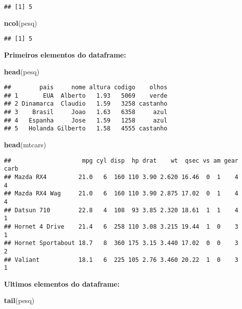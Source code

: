 \documentclass[]{article}
\newenvironment{Shaded}{\begin{snugshade}}{\end{snugshade}}
\newcommand{\KeywordTok}[1]{\textcolor[rgb]{0.13,0.29,0.53}{\textbf{#1}}}
\newcommand{\NormalTok}[1]{#1}
\begin{document}
\begin{verbatim}
## [1] 5
\end{verbatim}

\begin{Shaded}
\begin{Highlighting}[]
\KeywordTok{ncol}\NormalTok{(pesq)}
\end{Highlighting}
\end{Shaded}

\begin{verbatim}
## [1] 5
\end{verbatim}

\textbf{Primeiros elementos do dataframe:}

\begin{Shaded}
\begin{Highlighting}[]
\KeywordTok{head}\NormalTok{(pesq)}
\end{Highlighting}
\end{Shaded}

\begin{verbatim}
##        pais     nome altura codigo    olhos
## 1       EUA  Alberto   1.93   5069    verde
## 2 Dinamarca  Claudio   1.59   3258 castanho
## 3    Brasil     Joao   1.63   6358     azul
## 4   Espanha     Jose   1.59   1258     azul
## 5   Holanda Gilberto   1.58   4555 castanho
\end{verbatim}

\begin{Shaded}
\begin{Highlighting}[]
\KeywordTok{head}\NormalTok{(mtcars)}
\end{Highlighting}
\end{Shaded}

\begin{verbatim}
##                    mpg cyl disp  hp drat    wt  qsec vs am gear carb
## Mazda RX4         21.0   6  160 110 3.90 2.620 16.46  0  1    4    4
## Mazda RX4 Wag     21.0   6  160 110 3.90 2.875 17.02  0  1    4    4
## Datsun 710        22.8   4  108  93 3.85 2.320 18.61  1  1    4    1
## Hornet 4 Drive    21.4   6  258 110 3.08 3.215 19.44  1  0    3    1
## Hornet Sportabout 18.7   8  360 175 3.15 3.440 17.02  0  0    3    2
## Valiant           18.1   6  225 105 2.76 3.460 20.22  1  0    3    1
\end{verbatim}

\textbf{Ultimos elementos do dataframe:}

\begin{Shaded}
\begin{Highlighting}[]
\KeywordTok{tail}\NormalTok{(pesq)}
\end{Highlighting}
\end{Shaded}
\end{document}
